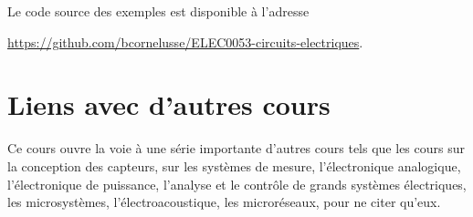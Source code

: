 Le code source des exemples est disponible à l'adresse
\begin{center}
	\small
\url{https://github.com/bcornelusse/ELEC0053-circuits-electriques}.
\end{center}

\section{Liens avec d'autres cours}
Ce cours ouvre la voie à une série importante d'autres cours tels que les cours sur la conception des capteurs, sur les systèmes de mesure, l'électronique analogique, l'électronique de puissance, l'analyse et le contrôle de grands systèmes électriques, les microsystèmes, l'électroacoustique, les microréseaux, pour ne citer qu'eux.